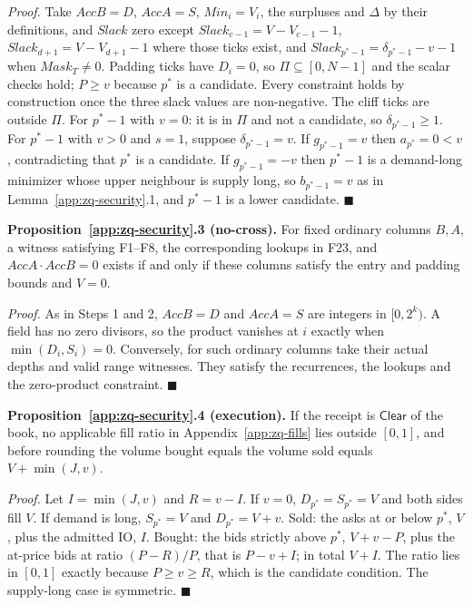 \emph{Proof.} Take \(AccB = D\), \(AccA = S\), \(Min_i = V_i\), the surpluses and \(\Delta\) by their definitions, and \(Slack\) zero except \(Slack_{c-1} = V - V_{c-1} - 1\), \(Slack_{d+1} = V - V_{d+1} - 1\) where those ticks exist, and \(Slack_{p^*-1} = \delta_{p^*-1} - v - 1\) when \(Mask_T \ne 0\). Padding ticks have \(D_i = 0\), so \(\Pi \subseteq [0, N-1]\) and the scalar checks hold; \(P \ge v\) because \(p^*\) is a candidate. Every constraint holds by construction once the three slack values are non-negative. The cliff ticks are outside \(\Pi\). For \(p^* - 1\) with \(v = 0\): it is in \(\Pi\) and not a candidate, so \(\delta_{p^*-1} \ge 1\). For \(p^* - 1\) with \(v > 0\) and \(s = 1\), suppose \(\delta_{p^*-1} = v\). If \(g_{p^*-1} = v\) then \(a_{p^*} = 0 < v\), contradicting that \(p^*\) is a candidate. If \(g_{p^*-1} = -v\) then \(p^* - 1\) is a demand-long minimizer whose upper neighbour is supply long, so \(b_{p^*-1} = v\) as in Lemma~\ref{app:zq-security}.1, and \(p^* - 1\) is a lower candidate. \(\blacksquare\)

\textbf{Proposition~\ref{app:zq-security}.3 (no-cross).} For fixed ordinary columns \(B,A\), a witness satisfying F1--F8, the corresponding lookups in F23, and \(AccA \cdot AccB = 0\) exists if and only if these columns satisfy the entry and padding bounds and \(V=0\).

\emph{Proof.} As in Steps 1 and 2, \(AccB = D\) and \(AccA = S\) are integers in \([0, 2^k)\). A field has no zero divisors, so the product vanishes at \(i\) exactly when \(\min(D_i, S_i) = 0\). Conversely, for such ordinary columns take their actual depths and valid range witnesses. They satisfy the recurrences, the lookups and the zero-product constraint. \(\blacksquare\)

\textbf{Proposition~\ref{app:zq-security}.4 (execution).} If the receipt is \(\mathsf{Clear}\) of the book, no applicable fill ratio in Appendix~\ref{app:zq-fills} lies outside \([0,1]\), and before rounding the volume bought equals the volume sold equals \(V + \min(J, v)\).

\emph{Proof.} Let \(I = \min(J, v)\) and \(R = v - I\). If \(v = 0\), \(D_{p^*} = S_{p^*} = V\) and both sides fill \(V\). If demand is long, \(S_{p^*} = V\) and \(D_{p^*} = V + v\). Sold: the asks at or below \(p^*\), \(V\), plus the admitted IO, \(I\). Bought: the bids strictly above \(p^*\), \(V + v - P\), plus the at-price bids at ratio \((P - R)/P\), that is \(P - v + I\); in total \(V + I\). The ratio lies in \([0, 1]\) exactly because \(P \ge v \ge R\), which is the candidate condition. The supply-long case is symmetric. \(\blacksquare\)

